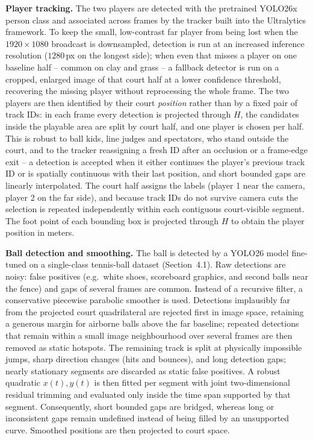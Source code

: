 \documentclass[10pt,twocolumn,a4paper]{article}
\begin{document}
	\textbf{Player tracking.} The two players are detected with the pretrained YOLO26x person class and associated across frames by the tracker built into the Ultralytics framework. To keep the small, low-contrast far player from being lost when the $1920\times1080$ broadcast is downsampled, detection is run at an increased inference resolution ($1280$\,px on the longest side); when even that misses a player on one baseline half -- common on clay and grass -- a fallback detector is run on a cropped, enlarged image of that court half at a lower confidence threshold, recovering the missing player without reprocessing the whole frame. The two players are then identified by their court \emph{position} rather than by a fixed pair of track IDs: in each frame every detection is projected through $H$, the candidates inside the playable area are split by court half, and one player is chosen per half. This is robust to ball kids, line judges and spectators, who stand outside the court, and to the tracker reassigning a fresh ID after an occlusion or a frame-edge exit -- a detection is accepted when it either continues the player's previous track ID or is spatially continuous with their last position, and short bounded gaps are linearly interpolated. The court half assigns the labels (player 1 near the camera, player 2 on the far side), and because track IDs do not survive camera cuts the selection is repeated independently within each contiguous court-visible segment. The foot point of each bounding box is projected through $H$ to obtain the player position in meters.

	\textbf{Ball detection and smoothing.} The ball is detected by a YOLO26 model fine-tuned on a single-class tennis-ball dataset (Section~4.1). Raw detections are noisy: false positives (e.g.\ white shoes, scoreboard graphics, and second balls near the fence) and gaps of several frames are common. Instead of a recursive filter, a conservative piecewise parabolic smoother is used. Detections implausibly far from the projected court quadrilateral are rejected first in image space, retaining a generous margin for airborne balls above the far baseline; repeated detections that remain within a small image neighbourhood over several frames are then removed as static hotspots. The remaining track is split at physically impossible jumps, sharp direction changes (hits and bounces), and long detection gaps; nearly stationary segments are discarded as static false positives. A robust quadratic $x(t),y(t)$ is then fitted per segment with joint two-dimensional residual trimming and evaluated only inside the time span supported by that segment. Consequently, short bounded gaps are bridged, whereas long or inconsistent gaps remain undefined instead of being filled by an unsupported curve. Smoothed positions are then projected to court space.
\end{document}
